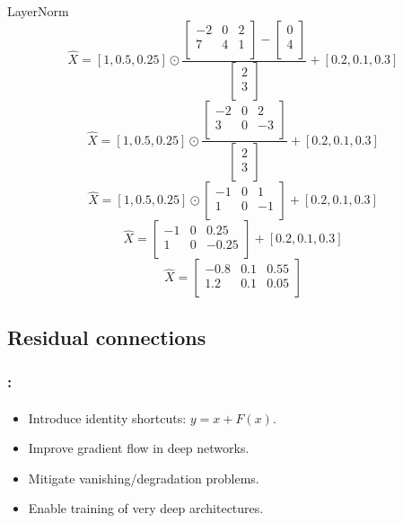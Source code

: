 \documentclass[xcolor=table]{beamer}
\begin{document}
\begin{frame}
\begin{minipage}{0.49\textwidth}
\begin{exampleblock}{LayerNorm}
			\[\hat{X} = [1, 0.5, 0.25] \odot \frac{\begin{bmatrix}
					-2 & 0 & 2 \\
					7 & 4 & 1 \\
				\end{bmatrix} - \begin{bmatrix} 0\\4\\\end{bmatrix}}{\begin{bmatrix} 2\\3\\\end{bmatrix}} + [0.2, 0.1, 0.3]\]
			\[\hat{X} = [1, 0.5, 0.25] \odot \frac{\begin{bmatrix}
					-2 & 0 & 2 \\
					3 & 0 & -3 \\
				\end{bmatrix}}{\begin{bmatrix} 2\\3\\\end{bmatrix}} + [0.2, 0.1, 0.3]\]
			\[\hat{X} = [1, 0.5, 0.25] \odot \begin{bmatrix}
				-1 & 0 & 1 \\
				1  & 0 & -1 \\
			\end{bmatrix} + [0.2, 0.1, 0.3]\]
			\[\hat{X} = \begin{bmatrix}
				-1 & 0 & 0.25 \\
				1  & 0 & -0.25 \\
			\end{bmatrix} + [0.2, 0.1, 0.3]\]
			\[\hat{X} = \begin{bmatrix}
				-0.8 & 0.1 & 0.55 \\
				1.2  & 0.1 & 0.05 \\
			\end{bmatrix}\]
		\end{exampleblock}
	\end{minipage}
	
\end{frame}


\subsection{Residual connections}

\begin{frame}
	\frametitle{\insertshortsubtitle: \insertsection}
	\framesubtitle{\insertsubsection}
	
	\begin{itemize}
		\item Introduce identity shortcuts: $y = x + F(x)$.
		\item Improve gradient flow in deep networks.
		\item Mitigate vanishing/degradation problems.
		\item Enable training of very deep architectures.
	\end{itemize}
	
\end{frame}
\end{document}
